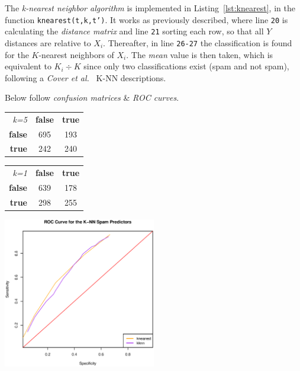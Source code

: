 \documentclass[a4paper, twocolumn]{article}
\begin{document}
    The \emph{k-nearest neighbor algorithm} is implemented in Listing~\ref{lst:knearest}, in the function \texttt{knearest(t,k,t')}. It works as previously described, where line \texttt{20} is calculating the \emph{distance matrix} and line \texttt{21} sorting each row, so that all $Y$ distances are relative to $X_i$. Thereafter, in line \texttt{26-27} the classification is found for the $K$-nearest neighbors of $X_i$. The \emph{mean} value is then taken, which is equivalent to $K_i \div K$ since only two classifications exist (spam and not spam), following a \emph{Cover et al.}~\cite{cover1967nearest} K-NN descriptions.

    Below follow \emph{confusion matrices} \& \emph{ROC curves}.

    \begin{table}[h]
    \begin{center}
    \begin{tabular}{r|c|c|}
        \multicolumn{1}{r}{\emph{k=5}}
        &\multicolumn{1}{c}{\textbf{false}}
        &\multicolumn{1}{c}{\textbf{true}} \\
        \cline{2-3}
        \textbf{false} & 695 & 193 \\
        \cline{2-3}
        \textbf{true} & 242 & 240 \\
        \cline{2-3}
    \end{tabular}
    \begin{tabular}{r|c|c|}
        \multicolumn{1}{r}{\emph{k=1}}
        &\multicolumn{1}{c}{\textbf{false}}
        &\multicolumn{1}{c}{\textbf{true}} \\
        \cline{2-3}
        \textbf{false} & 639 & 178 \\
        \cline{2-3}
        \textbf{true} & 298 & 255 \\
        \cline{2-3}
    \end{tabular}
    \end{center}
    \end{table}

    \includegraphics[width=0.5\textwidth]{share/spam.eps}
\end{document}
